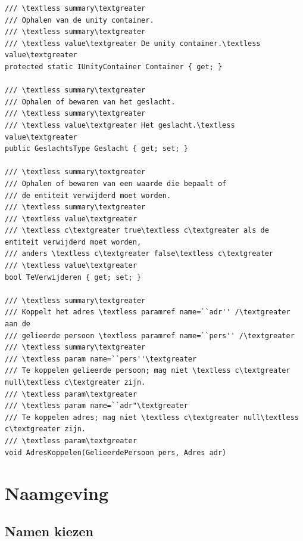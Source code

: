 \documentclass[a4paper,11pt]{article}
\begin{document}
\begin{lstlisting}[float,caption=XML-documentatie, label=lstDocumentatie]
/// \textless summary\textgreater
/// Ophalen van de unity container.
/// \textless summary\textgreater
/// \textless value\textgreater De unity container.\textless value\textgreater
protected static IUnityContainer Container { get; }

/// \textless summary\textgreater
/// Ophalen of bewaren van het geslacht.
/// \textless summary\textgreater
/// \textless value\textgreater Het geslacht.\textless value\textgreater
public GeslachtsType Geslacht { get; set; }

/// \textless summary\textgreater
/// Ophalen of bewaren van een waarde die bepaalt of 
/// de entiteit verwijderd moet worden.
/// \textless summary\textgreater
/// \textless value\textgreater
/// \textless c\textgreater true\textless c\textgreater als de entiteit verwijderd moet worden,
/// anders \textless c\textgreater false\textless c\textgreater
/// \textless value\textgreater
bool TeVerwijderen { get; set; }

/// \textless summary\textgreater
/// Koppelt het adres \textless paramref name=``adr'' /\textgreater aan de 
/// gelieerde persoon \textless paramref name=``pers'' /\textgreater
/// \textless summary\textgreater
/// \textless param name=``pers''\textgreater
/// Te koppelen gelieerde persoon; mag niet \textless c\textgreater null\textless c\textgreater zijn.
/// \textless param\textgreater
/// \textless param name=``adr"\textgreater
/// Te koppelen adres; mag niet \textless c\textgreater null\textless c\textgreater zijn.
/// \textless param\textgreater
void AdresKoppelen(GelieerdePersoon pers, Adres adr)
\end{lstlisting}

\section{Naamgeving}

\subsection{Namen kiezen}
\end{document}
